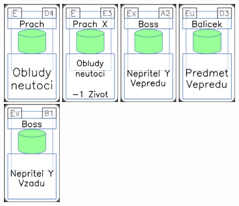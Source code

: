 \documentclass[a4paper]{article}
\begin{document}
	\includegraphics[width=3.0cm]{img-4_48}
	\includegraphics[width=3.0cm]{img-4_52}
	\includegraphics[width=3.0cm]{img-4_1}
	\includegraphics[width=3.0cm]{img-4_17}
	\includegraphics[width=3.0cm]{img-4_5}
\end{document}

